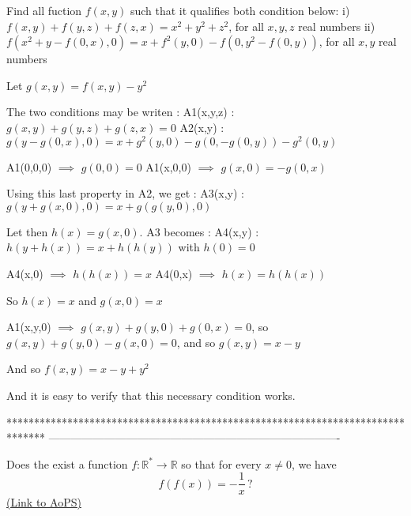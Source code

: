 \begin{solution}
	\begin{tcolorbox}Find all fuction $ f(x,y)$ such that it qualifies both condition below:
i)  $ f(x,y) + f(y,z) + f(z,x) = x^2 + y^2 + z^2$, for all $ x,y,z$ real numbers
ii) $ f(x^2 + y - f(0,x),0) = x + f^2(y,0) - f(0,y^2 - f(0,y))$, for all $ x,y$ real numbers\end{tcolorbox}

Let $ g(x,y)=f(x,y)-y^2$

The two conditions may be writen :
A1(x,y,z) : $ g(x,y)+g(y,z)+g(z,x)=0$
A2(x,y) : $ g(y-g(0,x),0)=x+g^2(y,0)-g(0,-g(0,y))-g^2(0,y)$

A1(0,0,0) $ \implies$ $ g(0,0)=0$
A1(x,0,0) $ \implies$ $ g(x,0)=-g(0,x)$

Using this last property in A2, we get :
A3(x,y) : $ g(y+g(x,0),0)=x+g(g(y,0),0)$

Let then $ h(x)=g(x,0)$. A3 becomes :
A4(x,y) : $ h(y+h(x))=x+h(h(y))$ with $ h(0)=0$

A4(x,0) $ \implies$ $ h(h(x))=x$
A4(0,x) $ \implies$ $ h(x)=h(h(x))$ 

So $ h(x)=x$ and $ g(x,0)=x$

A1(x,y,0) $ \implies$ $ g(x,y)+g(y,0)+g(0,x)=0$, so $ g(x,y)+g(y,0)-g(x,0)=0$, and so $ g(x,y)=x-y$

And so $ f(x,y)=x-y+y^2$

And it is easy to verify that this necessary condition works.
\end{solution}
*******************************************************************************
-------------------------------------------------------------------------------

\begin{problem}
	Does the exist a function $ f: \mathbb R^* \rightarrow \mathbb R$ so that for every $ x\ne 0$, we have
\[ f(f(x))=-\frac 1x \, ?\]
	\flushright \href{https://artofproblemsolving.com/community/c6h272801}{(Link to AoPS)}
\end{problem}




